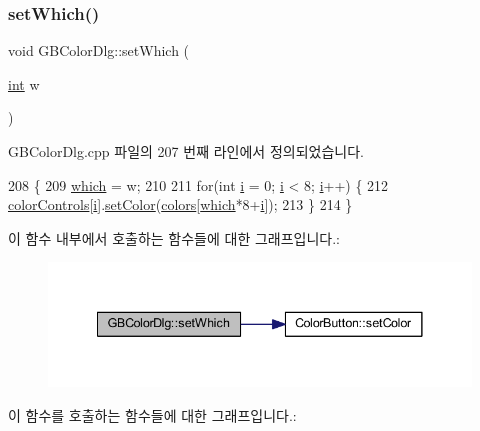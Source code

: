 \subsubsection{\texorpdfstring{set\+Which()}{setWhich()}}
{\footnotesize\ttfamily void G\+B\+Color\+Dlg\+::set\+Which (\begin{DoxyParamCaption}\item[{\mbox{\hyperlink{_util_8cpp_a0ef32aa8672df19503a49fab2d0c8071}{int}}}]{w }\end{DoxyParamCaption})}



G\+B\+Color\+Dlg.\+cpp 파일의 207 번째 라인에서 정의되었습니다.


\begin{DoxyCode}
208 \{
209   \mbox{\hyperlink{class_g_b_color_dlg_a8f7bbf1c4a4ffe4a6c57454b9087ff28}{which}} = w;
210 
211   \textcolor{keywordflow}{for}(\textcolor{keywordtype}{int} \mbox{\hyperlink{expr-lex_8cpp_acb559820d9ca11295b4500f179ef6392}{i}} = 0; \mbox{\hyperlink{expr-lex_8cpp_acb559820d9ca11295b4500f179ef6392}{i}} < 8; \mbox{\hyperlink{expr-lex_8cpp_acb559820d9ca11295b4500f179ef6392}{i}}++) \{
212     \mbox{\hyperlink{class_g_b_color_dlg_a7b80bc0f290c7f26e84283dc7c457240}{colorControls}}[\mbox{\hyperlink{expr-lex_8cpp_acb559820d9ca11295b4500f179ef6392}{i}}].\mbox{\hyperlink{class_color_button_a9ff5dc144a4acd5e2551ab94506b3bb0}{setColor}}(\mbox{\hyperlink{class_g_b_color_dlg_a24de2e906e28d7b4a006d68d6c8afeee}{colors}}[\mbox{\hyperlink{class_g_b_color_dlg_a8f7bbf1c4a4ffe4a6c57454b9087ff28}{which}}*8+\mbox{\hyperlink{expr-lex_8cpp_acb559820d9ca11295b4500f179ef6392}{i}}]);
213   \}
214 \}
\end{DoxyCode}
이 함수 내부에서 호출하는 함수들에 대한 그래프입니다.\+:
\nopagebreak
\begin{figure}[H]
\begin{center}
\leavevmode
\includegraphics[width=341pt]{class_g_b_color_dlg_a1e00eaaeaf344a830f1dd5692e26af1d_cgraph}
\end{center}
\end{figure}
이 함수를 호출하는 함수들에 대한 그래프입니다.\+:
\nopagebreak
